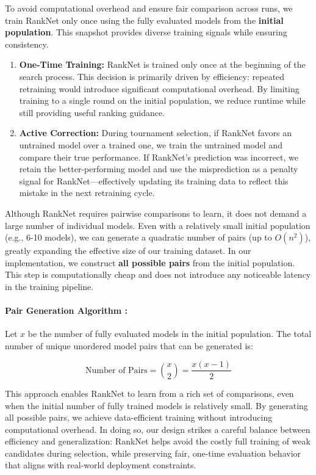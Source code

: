 To avoid computational overhead and ensure fair comparison across runs, we train RankNet only once using the fully evaluated models from the \textbf{initial population}. This snapshot provides diverse training signals while ensuring consistency.

\begin{enumerate}
    \item \textbf{One-Time Training:} RankNet is trained only once at the beginning of the search process. This decision is primarily driven by efficiency: repeated retraining would introduce significant computational overhead. By limiting training to a single round on the initial population, we reduce runtime while still providing useful ranking guidance.

    \item \textbf{Active Correction:} During tournament selection, if RankNet favors an untrained model over a trained one, we train the untrained model and compare their true performance. If RankNet’s prediction was incorrect, we retain the better-performing model and use the misprediction as a penalty signal for RankNet—effectively updating its training data to reflect this mistake in the next retraining cycle.
\end{enumerate}

Although RankNet requires pairwise comparisons to learn, it does not demand a large number of individual models. Even with a relatively small initial population (e.g., 6-10 models), we can generate a quadratic number of pairs (up to $O(n^2)$), greatly expanding the effective size of our training dataset. In our implementation, we construct \textbf{all possible pairs} from the initial population. This step is computationally cheap and does not introduce any noticeable latency in the training pipeline.

\paragraph{Pair Generation Algorithm :}
Let $x$ be the number of fully evaluated models in the initial population. The total number of unique unordered model pairs that can be generated is:

\[
\text{Number of Pairs} = \binom{x}{2} = \frac{x(x - 1)}{2}
\]

This approach enables RankNet to learn from a rich set of comparisons, even when the initial number of fully trained models is relatively small. By generating all possible pairs, we achieve data-efficient training without introducing computational overhead. In doing so, our design strikes a careful balance between efficiency and generalization: RankNet helps avoid the costly full training of weak candidates during selection, while preserving fair, one-time evaluation behavior that aligns with real-world deployment constraints.


